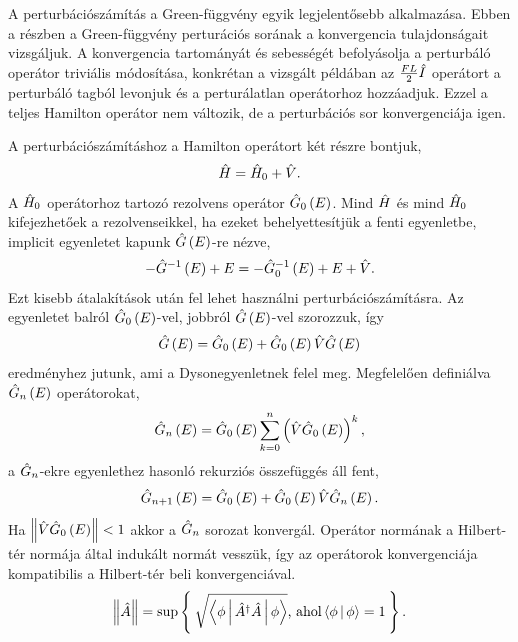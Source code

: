 A perturbációszámítás a Green-függvény egyik legjelentősebb alkalmazása. Ebben a részben a Green-függvény perturációs sorának a konvergencia tulajdonságait vizsgáljuk. A konvergencia tartományát és sebességét befolyásolja a perturbáló operátor triviális módosítása, konkrétan a vizsgált példában az $\frac{FL}{2}\hat{I}$ operátort a perturbáló tagból levonjuk és a perturálatlan operátorhoz hozzáadjuk. Ezzel a teljes Hamilton operátor nem változik, de a perturbációs sor konvergenciája igen.

A perturbációszámításhoz a Hamilton operátort két részre bontjuk,
\begin{equation}
	\hat{H} = \hat{H}_0 + \hat{V}.
\end{equation}
A $\hat{H}_0$ operátorhoz tartozó rezolvens operátor $\hat{G}_0\left(E\right)$. Mind $\hat{H}$ és mind $\hat{H}_0$ kifejezhetőek a rezolvenseikkel, ha ezeket behelyettesítjük a fenti egyenletbe, implicit egyenletet kapunk $\hat{G}\left(E\right)$-re nézve,
\begin{equation}
	-\hat{G}^{-1}\left(E\right) + E = -\hat{G}_0^{-1}\left(E\right) + E + \hat{V}.
\end{equation}
Ezt kisebb átalakítások után fel lehet használni perturbációszámításra. Az egyenletet balról $\hat{G}_0\left(E\right)$-vel, jobbról $\hat{G}\left(E\right)$-vel szorozzuk, így
\begin{equation}
	\hat{G}\left(E\right) = \hat{G}_0\left(E\right) + \hat{G}_0\left(E\right)\hat{V}\hat{G}\left(E\right)
	\label{green:pertmaster}
\end{equation}
eredményhez jutunk, ami a Dysonegyenletnek felel meg. Megfelelően definiálva $\hat{G}_n\left(E\right)$ operátorokat,
\begin{equation}
	\hat{G}_n\left(E\right) = \hat{G}_0\left(E\right)\sum_{k=0}^n\left(\hat{V}\hat{G}_0\left(E\right)\right)^k,
\end{equation}
a $\hat{G}_n$-ekre  egyenlethez hasonló rekurziós összefüggés áll fent,
\begin{equation}
	\hat{G}_{n+1}\left(E\right) = \hat{G}_0\left(E\right) + \hat{G}_0\left(E\right)\hat{V}\hat{G}_n\left(E\right).
	\label{perturbation:rekurzió}
\end{equation}
Ha $\left\lVert \hat{V}\hat{G}_0\left(E\right) \right\rVert < 1$ akkor a $\hat{G}_n$ sorozat konvergál. Operátor normának a Hilbert-tér normája által indukált normát vesszük, így az operátorok konvergenciája kompatibilis a Hilbert-tér beli konvergenciával.
\begin{equation}
	\left\lVert \hat{A} \right\rVert=\sup \Set{\sqrt{\Braket{\phi|\hat{A}^\dagger \hat{A}|\phi}} \text{, ahol} \Braket{\phi|\phi}=1}.
\end{equation}
